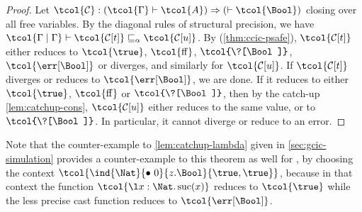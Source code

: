 \begin{proof}
  Let $\tcol{\mathcal{C}} : (\tcol{\Gamma} \vdash \tcol{A}) \Rightarrow (\vdash \tcol{\Bool})$
  closing over all free variables.
  By the diagonal rules of structural precision, we have
  $\tcol{\Gamma \mid \Gamma} \vdash \tcol{\mathcal{C}[t]} \capre \tcol{\mathcal{C}[u]}$.
  By  (\cref{thm:ccic-psafe}), $\tcol{\mathcal{C}[t]}$ either reduces
  to $\tcol{\true}$, $\tcol{\false}$, $\tcol{\?[\Bool]}$, $\tcol{\err[\Bool]}$ or diverges, and similarly for $\tcol{\mathcal{C}[u]}$.
  If $\tcol{\mathcal{C}[t]}$ diverges or reduces to $\tcol{\err[\Bool]}$, we are done.
  If it reduces to either $\tcol{\true}$, $\tcol{\false}$ or $\tcol{\?[\Bool]}$,
  then by the catch-up \cref{lem:catchup-cons},
  $\tcol{\mathcal{C}[u]}$ either reduces to the same value, or
  to $\tcol{\?[\Bool]}$.
  In particular, it cannot diverge or reduce to an error.
\end{proof}

Note that the counter-example to \cref{lem:catchup-lambda} given in
\cref{sec:gcic-simulation} provides a counter-example to this theorem as well for ,
by choosing the context $\tcol{\ind{\Nat}{\bullet~0}{z.\Bool}{\true,\true}}$,
because in that context the function $\tcol{\l x : \Nat . \S x}$ reduces to $\tcol{\true}$ while the less precise cast function reduces to $\tcol{\err[\Bool]}$.